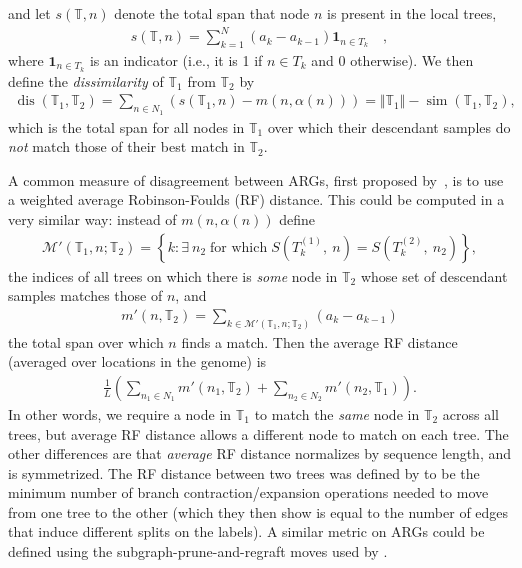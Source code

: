 \documentclass[10pt,twoside,lineno]{gsajnl}
\newcommand{\T}{\mathbb{T}}
\newcommand{\ind}{\mathbf{1}}
\newcommand{\dis}{\operatorname{dis}}
\newcommand{\similarity}{\operatorname{sim}}
\begin{document}
and let $s(\T,n)$ denote
the total span that node $n$ is present in the local trees,
\begin{align*}
    s(\T, n) = \sum_{k=1}^N (a_k - a_{k-1}) \ind_{n \in T_k} \quad ,
\end{align*}
where $\ind_{n \in T_k}$ is an indicator (i.e., it is 1 if $n \in T_k$ and 0 otherwise).
We then define the \emph{dissimilarity} of $\T_1$ from $\T_2$ by
\begin{align*}
    \dis(\T_1, \T_2)
    =
    \sum_{n \in N_1} (s(\T_1, n) - m(n, \alpha(n))) 
    = 
    \Vert \T_1\Vert -\similarity(\T_1,\T_2),
\end{align*}
which is the total span for all nodes in $\T_1$
over which their descendant samples do \emph{not} match those of their best match in $\T_2$.

A common measure of disagreement between ARGs, 
first proposed by~\cite{kuhner2015assessing}, 
is to use a weighted average Robinson-Foulds (RF) distance.
This could be computed in a very similar way:
instead of $m(n, \alpha(n))$ define
\begin{align*}
    \mathcal{M}'(\T_1, n; \T_2) = \left\{ k : \exists\ n_2  \;\text{for which}\; S\left(T^{(1)}_k,\ n\right) = S\left(T^{(2)}_k,\ n_2\right) \right\},
\end{align*}
the indices of all trees on which there is \emph{some} node in $\T_2$
whose set of descendant samples matches those of $n$, and
\begin{align*}
    m'(n, \T_2) = \sum_{k \in \mathcal{M}'(\T_1, n; \T_2)} (a_k - a_{k-1})
\end{align*}
the total span over which $n$ finds a match.
Then the average RF distance (averaged over locations in the genome)
is
\begin{align*}
    \frac{1}{L} \left( \sum_{n_1 \in N_1} m'(n_1, \T_2)  + \sum_{n_2 \in N_2} m'(n_2, \T_1) \right).
\end{align*}
In other words, we require a node in $\T_1$ to match the \emph{same} node in $\T_2$
across all trees, but average RF distance allows a different node to match
on each tree.
The other differences are that \emph{average} RF distance
normalizes by sequence length, and is symmetrized.
The RF distance between two trees
was defined by \citet{robinson1981comparison}
to be the minimum number of branch contraction/expansion operations needed to move
from one tree to the other
(which they then show is equal to the number of edges 
that induce different splits on the labels).
A similar metric on ARGs could be defined
using the subgraph-prune-and-regraft moves used by \citet{deng2024robust}.
\end{document}
